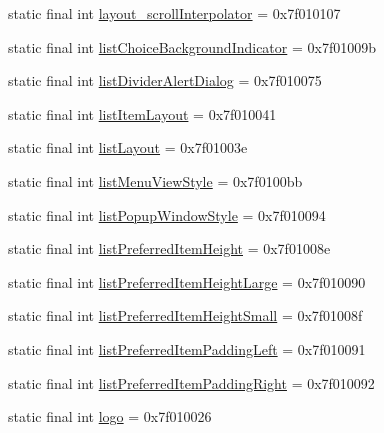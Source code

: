 \begin{CompactItemize}
\item 
static final int \hyperlink{classandroid_1_1support_1_1transition_1_1_r_1_1attr_5a8cf38e8e110afabe9c999965ff12d1}{layout\_\-scrollInterpolator} = 0x7f010107
\item 
static final int \hyperlink{classandroid_1_1support_1_1transition_1_1_r_1_1attr_4d85f023a18a936d18b589ac96fff8c3}{listChoiceBackgroundIndicator} = 0x7f01009b
\item 
static final int \hyperlink{classandroid_1_1support_1_1transition_1_1_r_1_1attr_8b3aa02c31c60df9e7074255ef44885e}{listDividerAlertDialog} = 0x7f010075
\item 
static final int \hyperlink{classandroid_1_1support_1_1transition_1_1_r_1_1attr_9ff16759f6cc670ad2009337b37823db}{listItemLayout} = 0x7f010041
\item 
static final int \hyperlink{classandroid_1_1support_1_1transition_1_1_r_1_1attr_dfd28cf430a057d64cf1e6339182eb2a}{listLayout} = 0x7f01003e
\item 
static final int \hyperlink{classandroid_1_1support_1_1transition_1_1_r_1_1attr_e93ad32fd28d06fe3dc477c132ace815}{listMenuViewStyle} = 0x7f0100bb
\item 
static final int \hyperlink{classandroid_1_1support_1_1transition_1_1_r_1_1attr_ae82c5ef152ac3e992cbb93053fe5ce5}{listPopupWindowStyle} = 0x7f010094
\item 
static final int \hyperlink{classandroid_1_1support_1_1transition_1_1_r_1_1attr_b96a3696988095a069dd3c07b3bff365}{listPreferredItemHeight} = 0x7f01008e
\item 
static final int \hyperlink{classandroid_1_1support_1_1transition_1_1_r_1_1attr_c4a1ce874d776080fc26115c6b925a67}{listPreferredItemHeightLarge} = 0x7f010090
\item 
static final int \hyperlink{classandroid_1_1support_1_1transition_1_1_r_1_1attr_f6a4b9952690fd929627db29d203601b}{listPreferredItemHeightSmall} = 0x7f01008f
\item 
static final int \hyperlink{classandroid_1_1support_1_1transition_1_1_r_1_1attr_4bf9f088a2ac747a7df4a10d92cb1c44}{listPreferredItemPaddingLeft} = 0x7f010091
\item 
static final int \hyperlink{classandroid_1_1support_1_1transition_1_1_r_1_1attr_cbfb355cbdc23c913d1136f856a6058f}{listPreferredItemPaddingRight} = 0x7f010092
\item 
static final int \hyperlink{classandroid_1_1support_1_1transition_1_1_r_1_1attr_4e21c8d5e3272c8c4683a1992622346e}{logo} = 0x7f010026
\item 

\end{CompactItemize}
